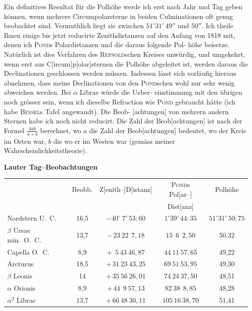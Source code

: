 \documentclass[12pt,a4paper]{article}
\theoremstyle{plain}
\theoremstyle{definition}
\theoremstyle{remark}
\begin{document}
Ein definitives Resultat f\"{u}r die Polh\"{o}he werde ich erst nach Jahr und
Tag geben k\"{o}nnen, wenn mehrere Circumpolarsterne in beiden Culminationen
oft genug beobachtet sind. Vermuthlich liegt sie zwischen $51^\circ 31'\,49''$ und $50''$.
Ich theile Ihnen einige bis jetzt reducirte Zenithdistanzen auf den Anfang
von 1818 mit, denen ich \textsc{Pond}s Polardistanzen und die daraus folgende Pol-
h\"{o}he beisetze. Nat\"{u}rlich ist dies Verfahren des \textsc{Repsold}schen Kreises unw\"{u}rdig,
und umgekehrt, wenn erst aus C[ircum]p[olar]sternen die Polh\"{o}he abgeleitet ist,
werden daraus die Declinationen geschlossen werden m\"{u}ssen. Indessen l\"{a}sst
sich vorl\"{a}ufig hieraus abnehmen, dass meine Declinationen von den \textsc{Pond}schen
wohl nur sehr wenig abweichen werden. Bei $\alpha$ Librae w\"{u}rde die Ueber-
einstimmung mit den \"{u}brigen noch gr\"{o}sser sein, wenn ich dieselbe Refraction
wie \textsc{Pond} gebraucht h\"{a}tte (ich habe \textsc{Bessel}s Tafel angewandt). Die Beob-
[achtungen] von mehrern andern Sternen habe ich noch nicht reducirt. Die
Zahl der Beob[achtungen] ist nach der Formel $\frac{4ab}{a+b}$ berechnet, wo $a$ die Zahl
der Beob[achtungen] bedeutet, wo der Kreis im Osten war, $b$ die wo er im
Westen war (gem\"{a}ss meiner Wahrscheinlichkeitstheorie).

\begin{center}
\textbf{Lauter Tag--Beobachtungen}
\end{center}

\begin{center}
\begin{tabular}{l|c|c|c|c}
\toprule
& Beobb. & Z[enith--]D[istanz] & \textsc{Pond}s Pol[ar--] & Polh\"{o}he \\
& & & Dist[anz] & \\
\midrule
Nordstern U.\ C. & 16,5 & $-40^\circ\ 7'\,53\!\!:\!\!60$ & $1^\circ 39'\,44\!\!:\!\!35$ & $51^\circ 31'\,50\!\!:\!\!75$ \\
$\beta$ Ursae min.\ O.\ C. & 13,7 & $-\,23\ 22\ \ 7,18$ & $15\ \ 6\ \ 2,50$ & 50,32 \\
Capella O.\ C. & 8,9 & $+\ \ 5\ 43\ 46,87$ & $44\ 11\ 57,65$ & 49,22 \\
Arcturus & 18,5 & $+\,31\ 23\ 43,25$ & $69\ 51\ 53,95$ & 49,30 \\
$\beta$ Leonis & 14 & $+\,35\ 56\ 26,01$ & $74\ 24\ 37,50$ & 48,51 \\
$\alpha$ Orionis & 8,9 & $+\,44\ \ 9\ 57,13$ & $82\ 38\ \ 8,85$ & 48,28 \\
$\alpha^2$ Librae & 13,7 & $+\,66\ 48\ 30,11$ & $105\ 16\ 38,70$ & 51,41 \\
\bottomrule
\end{tabular}
\end{center}
\end{document}
